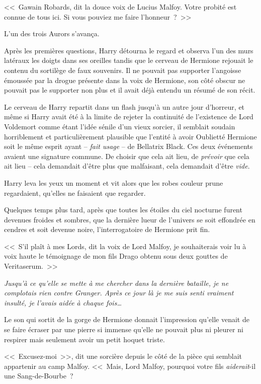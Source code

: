 <<~Gawain Robards, dit la douce voix de Lucius Malfoy. Votre probité est connue de tous ici. Si vous pouviez me faire l'honneur~?~>>

L'un des trois Aurors s'avança.

Après les premières questions, Harry détourna le regard et observa l'un des murs latéraux les doigts dans ses oreilles tandis que le cerveau de Hermione rejouait le contenu du sortilège de faux souvenirs. Il ne pouvait pas supporter l'angoisse émoussée par la drogue présente dans la voix de Hermione, son côté obscur ne pouvait pas le supporter non plus et il avait déjà entendu un résumé de son récit.

Le cerveau de Harry repartit dans un flash jusqu'à un autre jour d'horreur, et même si Harry avait été à la limite de rejeter la continuité de l'existence de Lord Voldemort comme étant l'idée sénile d'un vieux sorcier, il semblait soudain horriblement et particulièrement plausible que l'entité à avoir Oublietté Hermione soit le même esprit ayant -- \emph{fait usage} -- de Bellatrix Black. Ces deux événements avaient une signature commune. De choisir que cela ait lieu, de \emph{prévoir} que cela ait lieu -- cela demandait d'être plus que malfaisant, cela demandait d'être \emph{vide}.

Harry leva les yeux un moment et vit alors que les robes couleur prune regardaient, qu'elles ne faisaient que regarder.

Quelques temps plus tard, après que toutes les étoiles du ciel nocturne furent devenues froides et sombres, que la dernière lueur de l'univers se soit effondrée en cendres et soit devenue noire, l'interrogatoire de Hermione prit fin.

<<~S'il plaît à mes Lords, dit la voix de Lord Malfoy, je souhaiterais voir lu à voix haute le témoignage de mon fils Drago obtenu sous deux gouttes de Veritaserum.~>>

\emph{Jusqu'à ce qu'elle se mette à me chercher dans la dernière bataille, je ne complotais rien contre Granger. Après ce jour là je me suis senti vraiment insulté, je l'avais aidée à chaque fois…}

Le son qui sortit de la gorge de Hermione donnait l'impression qu'elle venait de se faire écraser par une pierre si immense qu'elle ne pouvait plus ni pleurer ni respirer mais seulement avoir un petit hoquet triste.

<<~Excusez-moi~>>, dit une sorcière depuis le côté de la pièce qui semblait appartenir au camp Malfoy. <<~Mais, Lord Malfoy, pourquoi votre fils \emph{aiderait}-il une Sang-de-Bourbe~?

